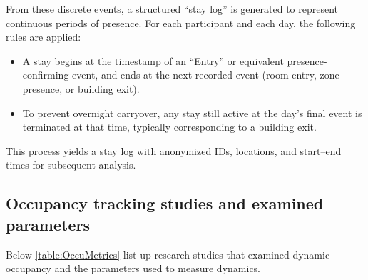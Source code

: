 From these discrete events, a structured ``stay log'' is generated to represent continuous periods of presence. For each participant and each day, the following rules are applied:
\begin{itemize}[noitemsep]
    \item A stay begins at the timestamp of an “Entry” or equivalent presence-confirming event, and ends at the next recorded event (room entry, zone presence, or building exit).
    \item To prevent overnight carryover, any stay still active at the day’s final event is terminated at that time, typically corresponding to a building exit.
\end{itemize}

This process yields a stay log with anonymized IDs, locations, and start–end times for subsequent analysis.


\subsection{Occupancy tracking studies and examined parameters}
\label{app:OccupancyStudy}
Below \autoref{table:OccuMetrics} list up research studies that examined dynamic occupancy and the parameters used to measure dynamics.

\begin{table}[pos=htbp!]
  \centering
  \caption{Summary of occupancy-related literature and metrics}
  
  \label{table:OccuMetrics}
\end{table}
